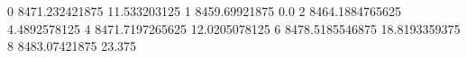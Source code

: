 0 8471.232421875 11.533203125
1 8459.69921875 0.0
2 8464.1884765625 4.4892578125
4 8471.7197265625 12.0205078125
6 8478.5185546875 18.8193359375
8 8483.07421875 23.375
